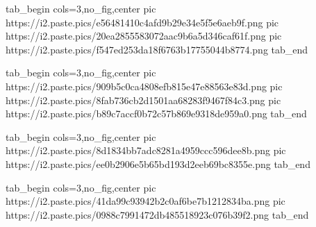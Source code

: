  
 
 
 
 
\zzSecCmtScr

\ifcmt
  tab_begin cols=3,no_fig,center
     pic https://i2.paste.pics/e56481410c4afd9b29e34e5f5e6aeb9f.png
		 pic https://i2.paste.pics/20ea2855583072aac9b6a5d346caf61f.png
		 pic https://i2.paste.pics/f547ed253da18f6763b17755044b8774.png
  tab_end
\fi

\ifcmt
  tab_begin cols=3,no_fig,center
	   pic https://i2.paste.pics/909b5c0ca4808efb815e47e88563e83d.png
		 pic https://i2.paste.pics/8fab736cb2d1501aa68283f9467f84c3.png
		 pic https://i2.paste.pics/b89c7accf0b72c57b869e9318de959a0.png
  tab_end
\fi

\ifcmt
  tab_begin cols=3,no_fig,center
	   pic https://i2.paste.pics/8d1834bb7adc8281a4959ccc596dee8b.png
		 pic https://i2.paste.pics/ee0b2906e5b65bd193d2eeb69bc8355e.png
  tab_end
\fi

\ifcmt
  tab_begin cols=3,no_fig,center
	   pic https://i2.paste.pics/41da99c93942b2c0af6be7b1212834ba.png
		 pic https://i2.paste.pics/0988c7991472db485518923c076b39f2.png
  tab_end
\fi

